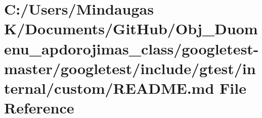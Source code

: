 \hypertarget{googletest-master_2googletest_2include_2gtest_2internal_2custom_2_r_e_a_d_m_e_8md}{}\section{C\+:/\+Users/\+Mindaugas K/\+Documents/\+Git\+Hub/\+Obj\+\_\+\+Duomenu\+\_\+apdorojimas\+\_\+class/googletest-\/master/googletest/include/gtest/internal/custom/\+R\+E\+A\+D\+ME.md File Reference}
\label{googletest-master_2googletest_2include_2gtest_2internal_2custom_2_r_e_a_d_m_e_8md}
